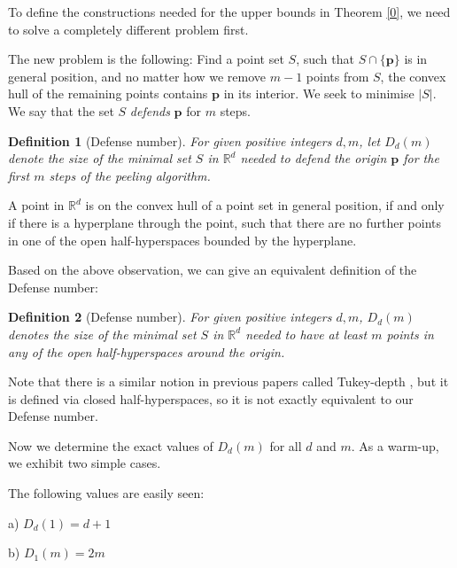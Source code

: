 \documentclass[a4paper,UKenglish,cleveref, autoref, thm-restate]{lipics-v2021}
\newtheorem*{definition*}{Definition}
\def\R{\mathbb{R}}
\def\p{\mathbf{p}}
\begin{document}
To define the constructions needed for the upper bounds in Theorem \ref{0}, we need to solve a completely different problem first.

 The new problem is the following: Find a point set $S$, such that $S\cap \{\mathbf{p}\}$ is in general position, and no matter how we remove $m-1$ points from $S$, the convex hull of the remaining points contains $\p$ in its interior. We seek to minimise $|S|$. We say that the set $S$ \emph{defends} $\p$ for $m$ steps.

\begin{definition*}[Defense number] \label{defense}
    For given positive integers $d,m$, let $D_d(m)$ denote the size of the minimal set $S$ in $\R^d$ needed to defend the origin $\p$ for the first $m$ steps of the peeling algorithm.
\end{definition*}

  \begin{observation}\label{halfobs}
    A point in $\R^d$ is on the convex hull of a point set in general position, if and only if there is a hyperplane through the point, such that there are no further points in one of the open half-hyperspaces bounded by the hyperplane.
    \end{observation}

 Based on the above observation, we can give an equivalent definition of the Defense number:

\begin{definition*}[Defense number] \label{defense2}
    For given positive integers $d,m$, $D_d(m)$ denotes the size of the minimal set $S$ in $\R^d$ needed to have at least $m$ points in any of the open half-hyperspaces around the origin.
\end{definition*}

 Note that there is a similar notion in previous papers called Tukey-depth \cite{Tukey}, but it is defined via closed half-hyperspaces, so it is not exactly equivalent to our Defense number.

 Now we determine the exact values of $D_d(m)$ for all $d$ and $m$. As a warm-up, we exhibit two simple cases.

\begin{proposition} \label{easyv}
The following values are easily seen:

 a) $D_d(1)=d+1$
 
 b) $D_1(m)=2m$

\end{proposition}
\end{document}
